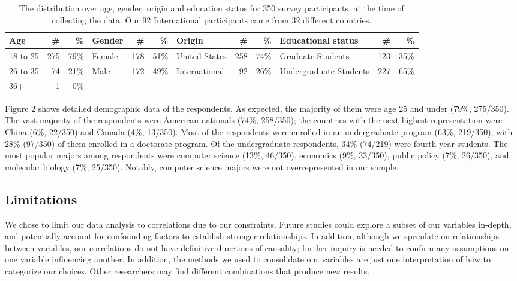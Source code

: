 \begin{table*}[h!]
\centering
\begin{tabular}{l r r |l r r|l r r|l r r} 
 \hline
 Age & \# & \% & Gender & \# & \% & Origin & \# & \% & Educational status & \# & \% \\
\hline
18 to 25 & 275 & 79\% & Female & 178 & 51\% & United States & 258 & 74\% & Graduate Students & 123 & 35\% \\
26 to 35 & 74 & 21\% & Male & 172 & 49\% & International & 92 & 26\% & Undergraduate Students & 227 & 65\% \\
36+ & 1 & 0\% & & & & & & & & & \\
 \hline
\end{tabular}
\caption{The distribution over age, gender, origin and education status for 350 survey participants, at the time of collecting the data. Our 92 International participants came from 32 different countries.}
\label{table:2}
\end{table*}

Figure 2 shows detailed demographic data of the respondents. As expected, the
majority of them were age 25 and under (79\%, 275/350). The vast majority of
the respondents were American nationals (74\%, 258/350); the countries with
the next-highest representation were China (6\%, 22/350) and Canada (4\%,
13/350). Most of the respondents were enrolled in an undergraduate
program (63\%, 219/350), with 28\% (97/350) of them enrolled in a doctorate
program. Of the undergraduate respondents, 34\% (74/219) were fourth-year
students. The most popular majors among respondents were computer science
(13\%, 46/350), economics (9\%, 33/350), public policy (7\%, 26/350), and
molecular biology (7\%, 25/350). Notably, computer science majors were not
overrepresented in our sample.



\subsection{Limitations}

We chose to limit our data
analysis to correlations due to our constraints. Future studies could explore
a subset of our variables in-depth, and potentially account for confounding
factors to establish stronger relationships. In addition, although we
speculate on relationships between variables, our correlations do not have
definitive directions of causality; further inquiry is needed to confirm any
assumptions on one variable influencing another. In addition, the methods we
used to consolidate our variables are just one interpretation of how to
categorize our choices. Other researchers may find different combinations that
produce new results.


